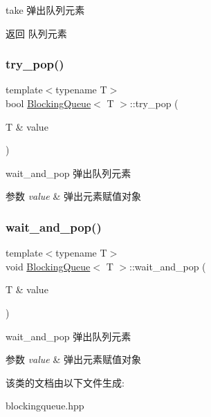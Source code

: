 take 弹出队列元素 

\begin{DoxyReturn}{返回}
队列元素 
\end{DoxyReturn}
\mbox{\label{classBlockingQueue_a47a2d7726112b4e2d7b3f65a4e84aa06}} 
\subsubsection{\texorpdfstring{try\+\_\+pop()}{try\_pop()}}
{\footnotesize\ttfamily template$<$typename T$>$ \\
bool \hyperlink{classBlockingQueue}{Blocking\+Queue}$<$ T $>$\+::try\+\_\+pop (\begin{DoxyParamCaption}\item[{T \&}]{value }\end{DoxyParamCaption})\hspace{0.3cm}{\ttfamily [inline]}}



wait\+\_\+and\+\_\+pop 弹出队列元素 


\begin{DoxyParams}{参数}
{\em value} & 弹出元素赋值对象 \\
\hline
\end{DoxyParams}
\mbox{\label{classBlockingQueue_a8efc43c38666a38402c39f772da63fcf}} 
\subsubsection{\texorpdfstring{wait\+\_\+and\+\_\+pop()}{wait\_and\_pop()}}
{\footnotesize\ttfamily template$<$typename T$>$ \\
void \hyperlink{classBlockingQueue}{Blocking\+Queue}$<$ T $>$\+::wait\+\_\+and\+\_\+pop (\begin{DoxyParamCaption}\item[{T \&}]{value }\end{DoxyParamCaption})\hspace{0.3cm}{\ttfamily [inline]}}



wait\+\_\+and\+\_\+pop 弹出队列元素 


\begin{DoxyParams}{参数}
{\em value} & 弹出元素赋值对象 \\
\hline
\end{DoxyParams}


该类的文档由以下文件生成\+:\begin{DoxyCompactItemize}
\item 
blockingqueue.\+hpp\end{DoxyCompactItemize}
